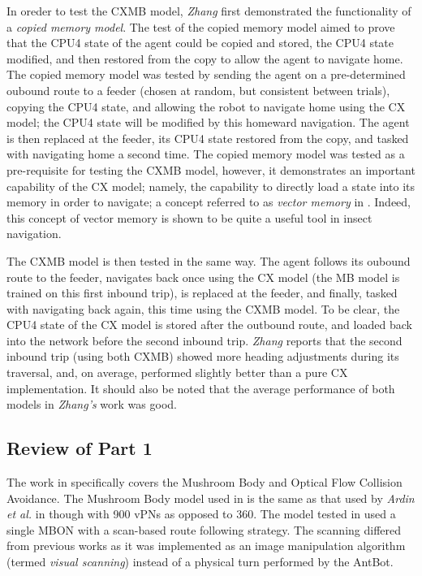 \documentclass[a4paper,11pt,twoside,openright]{article}
\begin{document}
In oreder to test the CXMB model, \textit{Zhang} first demonstrated the
functionality of a \textit{copied memory model}. The test of the copied memory
model aimed to prove that the CPU4 state of the agent could be copied and stored,
the CPU4 state modified, and then restored from the copy to allow the agent to
navigate home. The copied memory model was tested by sending the agent on a
pre-determined oubound route to a feeder (chosen at random, but consistent
between trials), copying the CPU4 state, and allowing the robot to navigate home
using the CX model; the CPU4 state will be modified by this homeward navigation.
The agent is then replaced at the feeder, its CPU4 state restored from the copy,
and tasked with navigating home a second time. The copied memory model was tested
as a pre-requisite for testing the CXMB model, however, it demonstrates an
important capability of the CX model; namely, the capability to directly load a
state into its memory in order to navigate; a concept referred to as
\textit{vector memory} in \cite{Webb2018}. Indeed, this concept of vector memory
is shown to be quite a useful tool in insect navigation\cite{Webb2018}.
\newline
\par

The CXMB model is then tested in the same way. The agent follows its oubound
route to the feeder, navigates back once using the CX model (the MB model is
trained on this first inbound trip), is replaced at the
feeder, and finally, tasked with navigating back again, this time using the CXMB
model. To be clear, the CPU4 state of the CX model is stored after the outbound
route, and loaded back into the network before the second inbound trip.
\textit{Zhang} reports that the second inbound trip (using both CXMB) showed
more heading adjustments during its traversal, and, on average, performed
slightly better than a pure CX implementation\cite{Zhang2017}. It should also
be noted that the average performance of both models in \textit{Zhang's} work
was good\cite{Zhang2017}.

\subsection{ Review of Part 1 }
The work in \cite{Mitchell2018} specifically covers the Mushroom Body
and Optical Flow Collision Avoidance. The Mushroom Body model used in
\cite{Mitchell2018} is the same as that used by \textit{Ardin et al.} in
\cite{Ardin2016} though with 900 vPNs as opposed to 360. The model tested
in \cite{Mitchell2018} used a single MBON with a scan-based route following
strategy. The scanning differed from previous works as it was implemented
as an image manipulation algorithm (termed \textit{visual scanning}) instead
of a physical turn performed by the AntBot.
\newline
\par
\end{document}
